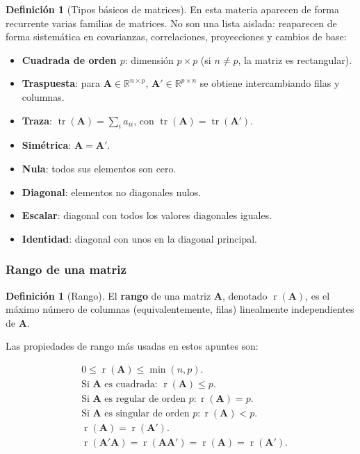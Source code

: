 \documentclass[12pt, a4paper]{article}
\theoremstyle{plain}
\theoremstyle{definition}
\newtheorem{definicion}[teorema]{Definición}
\theoremstyle{remark}
\newcommand{\R}{\mathbb{R}}
\newcommand{\mat}[1]{\mathbf{#1}}
\newcommand{\tr}{\operatorname{tr}}
\newcommand{\rg}{\operatorname{r}}
\begin{document}
\begin{definicion}[Tipos básicos de matrices]
En esta materia aparecen de forma recurrente varias familias de matrices. No
son una lista aislada: reaparecen de forma sistemática en covarianzas,
correlaciones, proyecciones y cambios de base:
\begin{itemize}
  \item \textbf{Cuadrada de orden $p$}: dimensión $p\times p$ (si $n\neq p$,
        la matriz es rectangular).
  \item \textbf{Traspuesta}: para $\mat{A}\in\R^{n\times p}$,
        $\mat{A}'\in\R^{p\times n}$ se obtiene intercambiando filas y columnas.
  \item \textbf{Traza}: $\tr(\mat{A})=\sum_i a_{ii}$, con
        $\tr(\mat{A})=\tr(\mat{A}')$.
  \item \textbf{Simétrica}: $\mat{A}=\mat{A}'$.
  \item \textbf{Nula}: todos sus elementos son cero.
  \item \textbf{Diagonal}: elementos no diagonales nulos.
  \item \textbf{Escalar}: diagonal con todos los valores diagonales iguales.
  \item \textbf{Identidad}: diagonal con unos en la diagonal principal.
\end{itemize}
\end{definicion}

\subsubsection{Rango de una matriz}

\begin{definicion}[Rango]
El \textbf{rango} de una matriz $\mat{A}$, denotado $\rg(\mat{A})$, es el
máximo número de columnas (equivalentemente, filas) linealmente independientes
de $\mat{A}$.
\end{definicion}

Las propiedades de rango más usadas en estos apuntes son:

\begin{mdframed}[style=resultado]
\begin{align}
  &0 \le \rg(\mat{A}) \le \min(n,p). \\
  &\text{Si }\mat{A}\text{ es cuadrada: }\rg(\mat{A}) \le p. \\
  &\text{Si }\mat{A}\text{ es regular de orden }p:\rg(\mat{A}) = p. \\
  &\text{Si }\mat{A}\text{ es singular de orden }p:\rg(\mat{A}) < p. \\
  &\rg(\mat{A}) = \rg(\mat{A}').\\
  &\rg(\mat{A}'\mat{A}) = \rg(\mat{A}\mat{A}') = \rg(\mat{A}) = \rg(\mat{A}').
\end{align}
\end{mdframed}
\end{document}
